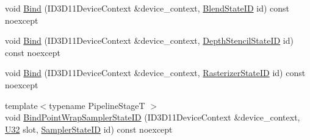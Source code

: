 \begin{DoxyCompactItemize}
void \mbox{\hyperlink{classmage_1_1rendering_1_1_state_manager_aee24b65a57f9c47c4c74e509884d1978}{Bind}} (I\+D3\+D11\+Device\+Context \&device\+\_\+context, \mbox{\hyperlink{namespacemage_1_1rendering_abdf11cdb816b9208aec6c3a81f7564ab}{Blend\+State\+ID}} id) const noexcept
\item 
void \mbox{\hyperlink{classmage_1_1rendering_1_1_state_manager_a0ae3054764b68d9e9c89c403b57b52b3}{Bind}} (I\+D3\+D11\+Device\+Context \&device\+\_\+context, \mbox{\hyperlink{namespacemage_1_1rendering_ace195e7a068336e477080fce30f1329e}{Depth\+Stencil\+State\+ID}} id) const noexcept
\item 
void \mbox{\hyperlink{classmage_1_1rendering_1_1_state_manager_a4b3f51dfa639bdb218e9103df4342638}{Bind}} (I\+D3\+D11\+Device\+Context \&device\+\_\+context, \mbox{\hyperlink{namespacemage_1_1rendering_ac878731f5dc22a3a36ccfbfc77c3faca}{Rasterizer\+State\+ID}} id) const noexcept
\item 
{\footnotesize template$<$typename Pipeline\+StageT $>$ }\\void \mbox{\hyperlink{classmage_1_1rendering_1_1_state_manager_a6771451495ed6d83c76e6f008b2d7c17}{Bind\+Point\+Wrap\+Sampler\+State\+ID}} (I\+D3\+D11\+Device\+Context \&device\+\_\+context, \mbox{\hyperlink{namespacemage_aa5d6eaabaac3cdd01873d6a3d27e90f3}{U32}} slot, \mbox{\hyperlink{namespacemage_1_1rendering_a6f80181126db61dbb8b528a6894eb658}{Sampler\+State\+ID}} id) const noexcept
\end{DoxyCompactItemize}
